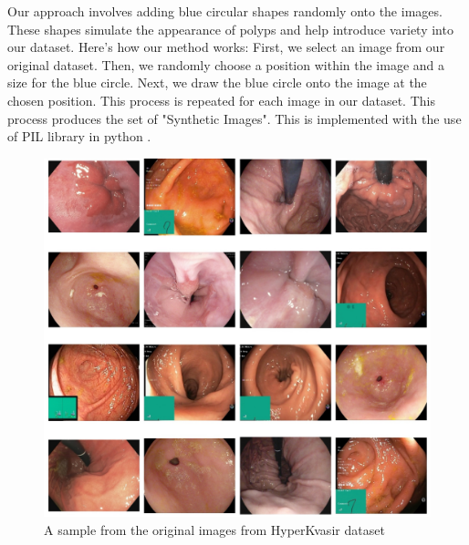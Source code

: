 \documentclass[UKenglish,12pt]{master-style}
\begin{document}
Our approach involves adding blue circular shapes randomly onto the images. These shapes simulate the appearance of polyps and help introduce variety into our dataset. Here's how our method works: First, we select an image from our original dataset. Then, we randomly choose a position within the image and a size for the blue circle. Next, we draw the blue circle onto the image at the chosen position. This process is repeated for each image in our dataset. This process produces the set of "Synthetic Images". This is implemented with the use of PIL library in python \cite{PyTorch_horse2zebra}.

\begin{figure}[ht]
    \centering
    \includegraphics[width=1\textwidth]{Images/Original_Images.jpeg}
    \caption{A sample from the original images from HyperKvasir dataset}
    \label{fig:Original_image}
\end{figure}
\end{document}
